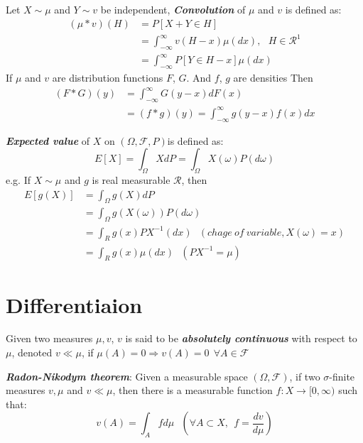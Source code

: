 \documentclass[10pt,twocolumn]{article}
\newenvironment{mydef}[1][Definition]{\begin{trivlist}
\item[\hskip \labelsep {\bfseries #1}]}{\end{trivlist}}
\newcommand{\probspace} {$(\Omega, \mathscr{F}, P)$}
\newcommand{\bt}[1]{\textbf{\textit{#1}}}
\begin{document}
\begin{mydef}
	Let $X\sim\mu$ and $Y\sim v$ be independent, \bt{Convolution} of $\mu$ and $v$ is defined as:
	\begin{align*} 
	 (\mu * v)(H) &= P[X+Y \in H] 	              \\
	 &= \int^{\infty}_{-\infty}v(H-x)\mu (dx), \ \ \ H \in \mathscr{R}^1  \\
	 &= \int^{\infty}_{-\infty} P[Y \in H - x]\mu (dx)
	\end{align*}
	If $\mu$ and $v$ are distribution functions $F$, $G$. And $f$, $g$ are densities Then
	\begin{align*}
		(F*G)(y) &= \int^{\infty}_{-\infty} G(y-x)dF(x) \\
		   &= (f*g)(y) =  \int^{\infty}_{-\infty} g(y-x)f(x)dx 
	\end{align*}
\end{mydef}

\begin{mydef}
	\bt{Expected value} of $X$ on \probspace is defined as:
	$$ E[X] = \int_\Omega X dP = \int_\Omega X(\omega)P(d\omega)$$
	e.g. If $X \sim \mu$ and $g$ is real measurable $\mathscr{R}$, then
	\begin{align*}
		E[g(X)] &= \int_\Omega g(X) dP \\
		&= \int_\Omega g(X(\omega))P(d\omega) \\
		&= \int_R g(x)PX^{-1}(dx)  \ \ \ (chage\ of \ variable, X(\omega)=x) \\
		&= \int_R g(x)\mu (dx) \ \ \ (PX^{-1} = \mu)
	\end{align*}
\end{mydef}

\section*{Differentiaion}
\begin{mydef}
	Given two measures $\mu, v$, $v$ is said to be \bt{absolutely continuous} with respect to $\mu$, denoted $v \ll \mu$, if  $\mu(A) =0 \Rightarrow v(A)=0 \ \ \forall A \in \mathscr{F}$
\end{mydef}
\begin{mydef}
	\bt{Radon-Nikodym theorem}: Given a measurable space $(\Omega, \mathscr{F})$, if two $\sigma$-finite measures $v, \mu$ and  $v \ll \mu$,  then there is a measurable function $f: X \rightarrow [0, \infty)$ such that:
	$$v(A) = \int_A fd\mu \ \ \ (\forall A \subset X, \ \ f = \frac{dv}{d\mu})$$
\end{mydef}
\end{document}
